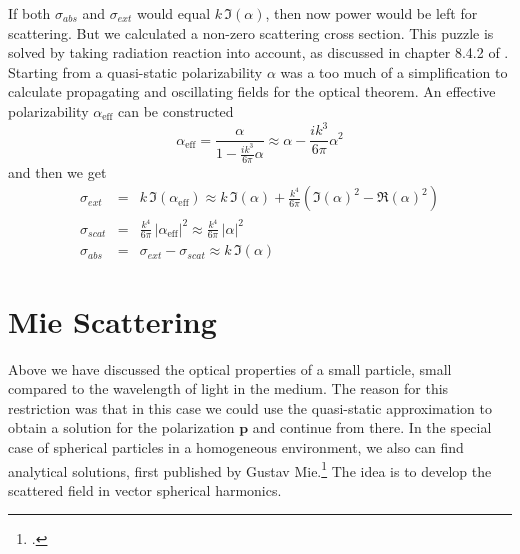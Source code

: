 If both $\sigma_{abs}$ and $\sigma_{ext}$  would equal $ k \, \Im ( \alpha )$, then now power would be left for scattering. But we calculated a non-zero scattering cross section. 
This puzzle is solved by taking radiation reaction into account, as discussed in chapter 8.4.2 of \cite{Novotny-Hecht2012}. Starting from a quasi-static polarizability $\alpha$ was a too much of a simplification to calculate propagating and oscillating fields  for the optical theorem. An effective  polarizability $\alpha_{\text{eff}}$ can be constructed 
\begin{equation}
 \alpha_{\text{eff}} = \frac{\alpha}{1 - \frac{i k^3 }{6 \pi} \alpha}
 \approx \alpha  - \frac{i k^3 }{6 \pi} \alpha^2
\end{equation}
and then we get
\begin{eqnarray}
 \sigma_{ext} &= & k \, \Im ( \alpha_{\text{eff}}  ) \approx 
 k \, \Im ( \alpha  )  + \frac{k^4}{6 \pi} \left( \Im (\alpha)^2 - \Re (\alpha)^2 \right) \\
  \sigma_{scat} & = &  \frac{k^4}{6 \pi }  \, |\alpha_{\text{eff}} |^2  \approx  \frac{k^4}{6 \pi }  \, |\alpha |^2 \\
   \sigma_{abs} &=&  \sigma_{ext} - \sigma_{scat} \approx  k \, \Im ( \alpha  ) 
\end{eqnarray}



\section{Mie Scattering}

Above we have discussed the optical properties of a small particle, small compared to the wavelength of light in the medium. The reason for this restriction was that in this case we could use the quasi-static approximation to obtain a solution for the polarization $\mathbf{p}$ and continue from there. In the special case of spherical particles in a homogeneous environment, we also can find analytical solutions, first published by Gustav Mie.\footcite[chapter 4]{BH-book} The idea is to develop the scattered field in vector spherical harmonics.

